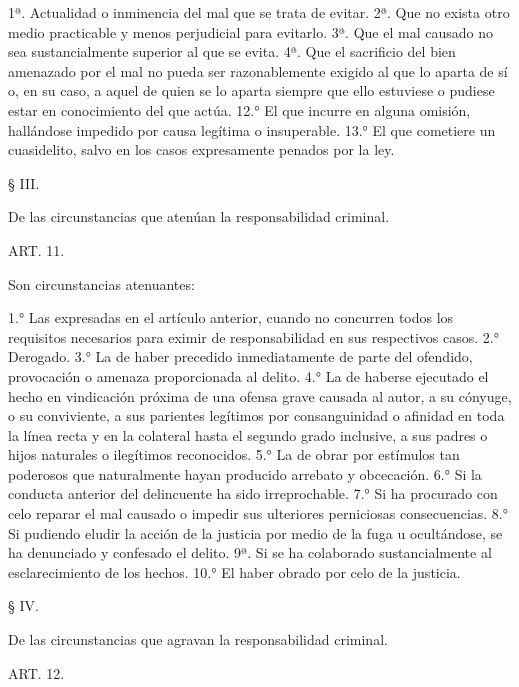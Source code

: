     1ª. Actualidad o inminencia del mal que se trata de evitar.
    2ª. Que no exista otro medio practicable y menos perjudicial para evitarlo.
    3ª. Que el mal causado no sea sustancialmente superior al que se evita.
    4ª. Que el sacrificio del bien amenazado por el mal no pueda ser razonablemente exigido al que lo aparta de sí o, en su caso, a aquel de quien se lo aparta siempre que ello estuviese o pudiese estar en conocimiento del que actúa.
    12.° El que incurre en alguna omisión, hallándose impedido por causa legítima o insuperable.
    13.° El que cometiere un cuasidelito, salvo en los casos expresamente penados por la ley.





    § III.

    De las circunstancias que atenúan la responsabilidad criminal.


    ART. 11.

    Son circunstancias atenuantes:

    1.° Las expresadas en el artículo anterior, cuando no concurren todos los requisitos necesarios para eximir de responsabilidad en sus respectivos casos.
    2.° Derogado.
    3.° La de haber precedido inmediatamente de parte del ofendido, provocación o amenaza proporcionada al delito.
    4.° La de haberse ejecutado el hecho en vindicación próxima de una ofensa grave causada al autor, a su cónyuge, o su conviviente, a sus parientes legítimos por consanguinidad o afinidad en toda la línea recta y en la colateral hasta el segundo grado inclusive, a sus padres o hijos naturales o ilegítimos reconocidos.
    5.°  La de obrar por estímulos tan poderosos que naturalmente hayan producido arrebato y obcecación.
    6.°  Si la conducta anterior del delincuente ha sido irreprochable.
    7.°  Si ha procurado con celo reparar el mal causado o impedir sus ulteriores perniciosas consecuencias.
    8.°  Si pudiendo eludir la acción de la justicia por medio de la fuga u ocultándose, se ha denunciado y confesado el delito.
    9ª. Si se ha colaborado sustancialmente al esclarecimiento de los hechos.
    10.° El haber obrado por celo de la justicia.




    § IV.

    De las circunstancias que agravan la responsabilidad criminal.


    ART. 12.

